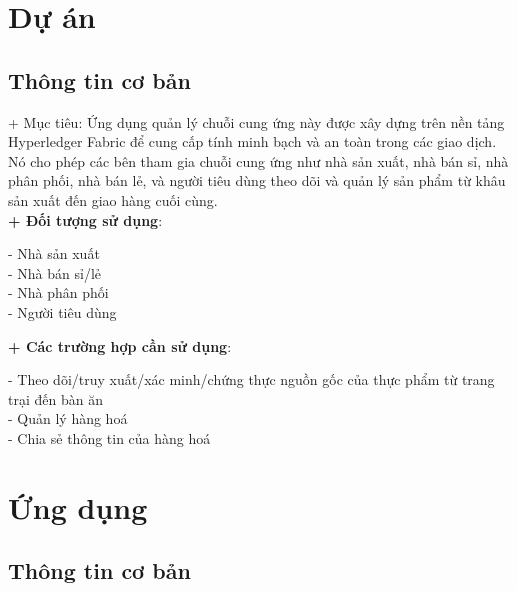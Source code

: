 \documentclass[a4paper,12pt]{article}
\begin{document}
{\color{red} \section{Dự án}}
{\color{red} \subsection{Thông tin cơ bản}}
+ Mục tiêu: Ứng dụng quản lý chuỗi cung ứng này được xây dựng trên nền tảng Hyperledger Fabric để cung cấp tính minh bạch và an toàn trong các giao dịch. Nó cho phép các bên tham gia chuỗi cung ứng như nhà sản xuất, nhà bán sỉ, nhà phân phối, nhà bán lẻ, và người tiêu dùng theo dõi và quản lý sản phẩm từ khâu sản xuất đến giao hàng cuối cùng.\\
\textbf{+ Đối tượng sử dụng}:
\begin{itemize}
- Nhà sản xuất\\
- Nhà bán sỉ/lẻ\\
- Nhà phân phối\\
- Người tiêu dùng\\
\end{itemize}

\textbf{+ Các trường hợp cần sử dụng}:
\begin{itemize}
- Theo dõi/truy xuất/xác minh/chứng thực nguồn gốc của thực phẩm từ trang trại đến bàn ăn\\
- Quản lý hàng hoá\\
- Chia sẻ thông tin của hàng hoá\\
\end{itemize}

{\color{red} \section{Ứng dụng}}
{\color{red} \subsection{Thông tin cơ bản}}
\end{document}
